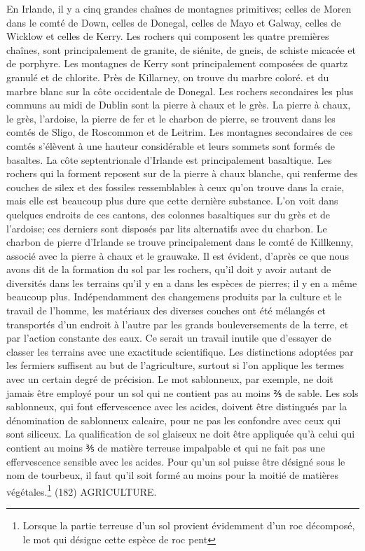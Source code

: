 En Irlande, il y a cinq grandes chaînes de montagnes primitives; celles de Moren dans le comté de Down, celles de Donegal, celles de Mayo et Galway, celles de Wicklow et celles de Kerry. Les rochers qui composent les quatre premières chaînes, sont principalement de granite, de siénite, de gneis, de schiste micacée et de porphyre. Les montagnes de Kerry sont principalement composées de quartz granulé et de chlorite. Près de Killarney, on trouve du marbre coloré.\setcounter{page}{480} et du marbre blanc sur la côte occidentale de Donegal. Les rochers secondaires les plus communs au midi de Dublin sont la pierre à chaux et le grès. La pierre à chaux, le grès, l'ardoise, la pierre de fer et le charbon de pierre, se trouvent dans les comtés de Sligo, de Roscommon et de Leitrim. Les montagnes secondaires de ces comtés s'élèvent à une hauteur considérable et leurs sommets sont formés de basaltes. La côte septentrionale d'Irlande est principalement basaltique. Les rochers qui la forment reposent sur de la pierre à chaux blanche, qui renferme des couches de silex et des fossiles ressemblables à ceux qu'on trouve dans la craie, mais elle est beaucoup plus dure que cette dernière substance. L'on voit dans quelques endroits de ces cantons, des colonnes basaltiques sur du grès et de l'ardoise; ces derniers sont disposés par lits alternatifs avec du charbon. Le charbon de pierre d'Irlande se trouve principalement dans le comté de Killkenny, associé avec la pierre à chaux et le grauwake. Il est évident, d'après ce que nous avons dit de la formation du sol par les rochers, qu'il doit y avoir autant de diversités dans les terrains qu'il y en a dans les espèces de pierres; il y en a même beaucoup plus. Indépendamment des changemens\setcounter{page}{481} produits par la culture et le travail de l'homme, les matériaux des diverses couches ont été mélangés et transportés d'un endroit à l'autre par les grands bouleversements de la terre, et par l'action constante des eaux. Ce serait un travail inutile que d'essayer de classer les terrains avec une exactitude scientifique. Les distinctions adoptées par les fermiers suffisent au but de l'agriculture, surtout si l'on applique les termes avec un certain degré de précision. Le mot sablonneux, par exemple, ne doit jamais être employé pour un sol qui ne contient pas au moins ⅖ de sable. Les sols sablonneux, qui font effervescence avec les acides, doivent être distingués par la dénomination de sablonneux calcaire, pour ne pas les confondre avec ceux qui sont siliceux. La qualification de sol glaiseux ne doit être appliquée qu'à celui qui contient au moins ⅗ de matière terreuse impalpable et qui ne fait pas une effervescence sensible avec les acides. Pour qu'un sol puisse être désigné sous le nom de tourbeux, il faut qu'il soit formé au moins pour la moitié de matières végétales.\footnote{Lorsque la partie terreuse d'un sol provient évidemment d'un roc décomposé, le mot qui désigne cette espèce de roc pent}\setcounter{page}{482} (182) AGRICULTURE.
